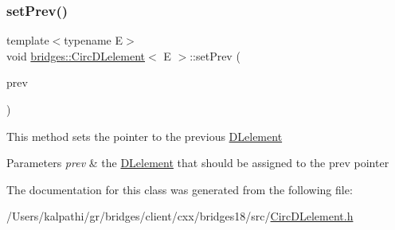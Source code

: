 \subsubsection{\texorpdfstring{set\+Prev()}{setPrev()}}
{\footnotesize\ttfamily template$<$typename E$>$ \\
void \mbox{\hyperlink{classbridges_1_1_circ_d_lelement}{bridges\+::\+Circ\+D\+Lelement}}$<$ E $>$\+::set\+Prev (\begin{DoxyParamCaption}\item[{\mbox{\hyperlink{classbridges_1_1_circ_d_lelement}{Circ\+D\+Lelement}}$<$ E $>$ $\ast$}]{prev }\end{DoxyParamCaption})\hspace{0.3cm}{\ttfamily [inline]}}

This method sets the pointer to the previous \mbox{\hyperlink{classbridges_1_1_d_lelement}{D\+Lelement}} 
\begin{DoxyParams}{Parameters}
{\em prev} & the \mbox{\hyperlink{classbridges_1_1_d_lelement}{D\+Lelement}} that should be assigned to the prev pointer \\
\hline
\end{DoxyParams}


The documentation for this class was generated from the following file\+:\begin{DoxyCompactItemize}
\item 
/\+Users/kalpathi/gr/bridges/client/cxx/bridges18/src/\mbox{\hyperlink{_circ_d_lelement_8h}{Circ\+D\+Lelement.\+h}}\end{DoxyCompactItemize}
